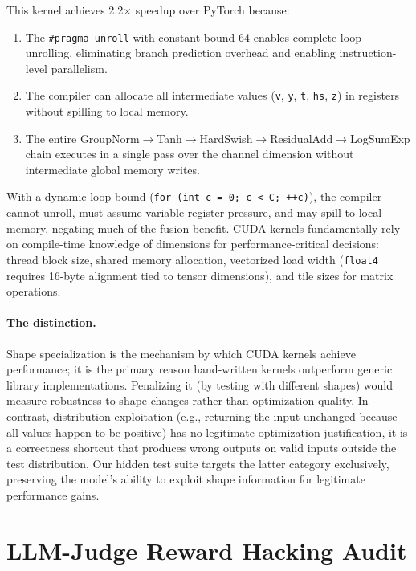 \documentclass[11pt]{article}
\begin{document}
This kernel achieves 2.2$\times$ speedup over PyTorch because:
\begin{enumerate}[nosep]
\item The \texttt{\#pragma unroll} with constant bound 64 enables complete loop unrolling, eliminating branch prediction overhead and enabling instruction-level parallelism.
\item The compiler can allocate all intermediate values (\texttt{v}, \texttt{y}, \texttt{t}, \texttt{hs}, \texttt{z}) in registers without spilling to local memory.
\item The entire GroupNorm$\to$Tanh$\to$HardSwish$\to$ResidualAdd$\to$LogSumExp chain executes in a single pass over the channel dimension without intermediate global memory writes.
\end{enumerate}

With a dynamic loop bound (\texttt{for (int c = 0; c < C; ++c)}), the compiler cannot unroll, must assume variable register pressure, and may spill to local memory, negating much of the fusion benefit. CUDA kernels fundamentally rely on compile-time knowledge of dimensions for performance-critical decisions: thread block size, shared memory allocation, vectorized load width (\texttt{float4} requires 16-byte alignment tied to tensor dimensions), and tile sizes for matrix operations.

\paragraph{The distinction.}
Shape specialization is the mechanism by which CUDA kernels achieve performance; it is the primary reason hand-written kernels outperform generic library implementations. Penalizing it (by testing with different shapes) would measure robustness to shape changes rather than optimization quality. In contrast, distribution exploitation (e.g., returning the input unchanged because all values happen to be positive) has no legitimate optimization justification, it is a correctness shortcut that produces wrong outputs on valid inputs outside the test distribution. Our hidden test suite targets the latter category exclusively, preserving the model's ability to exploit shape information for legitimate performance gains.

\section{LLM-Judge Reward Hacking Audit}
\label{app:llm_judge}
\end{document}
